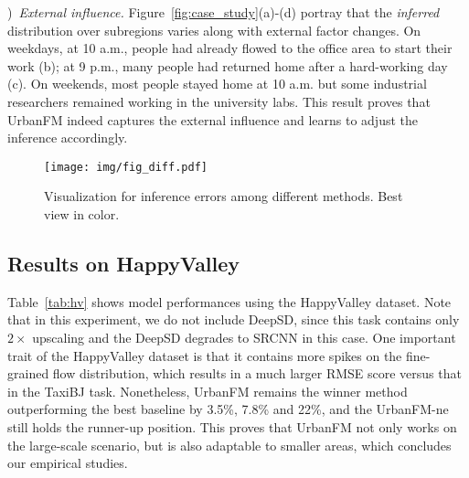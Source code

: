 )~\textit{External influence.} Figure~\ref{fig:case_study}(a)-(d) portray that the \textit{inferred} distribution over subregions varies along with external factor changes. On weekdays, at 10 a.m., people had already flowed to the office area to start their work (b); at 9 p.m., many people had returned home after a hard-working day (c). On weekends, most people stayed home at 10 a.m. but some industrial researchers remained working in the university labs. This result proves that UrbanFM indeed captures the external influence and learns to adjust the inference accordingly.

\begin{figure}[!t]
	\centering
	\texttt{[image: img/fig\_diff.pdf]}
	\vspace{-1em}
	\caption{\label{fig:diff} Visualization for inference errors among different methods. Best view in color.}	
	\vspace{-1em}
\end{figure}


\subsection{Results on HappyValley}
Table~\ref{tab:hv} shows model performances using the HappyValley dataset. Note that in this experiment, we do not include DeepSD, since this task contains only $2\times$ upscaling and the DeepSD degrades to SRCNN in this case. One important trait of the HappyValley dataset is that it contains more spikes on the fine-grained flow distribution, which results in a much larger RMSE score versus that in the TaxiBJ task. Nonetheless, UrbanFM remains the winner method outperforming the best baseline by 3.5\%, 7.8\% and 22\%, and the UrbanFM-ne still holds the runner-up position. This proves that UrbanFM not only works on the large-scale scenario, but is also adaptable to smaller areas, which concludes our empirical studies.

